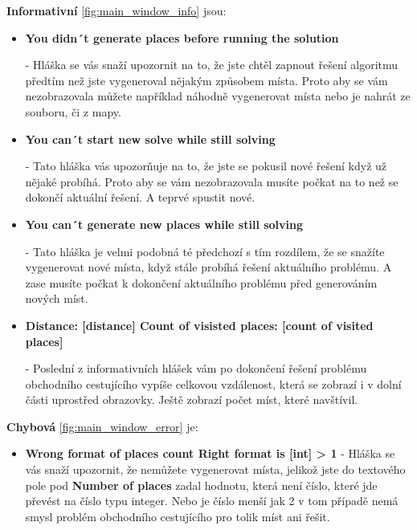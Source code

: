 \textbf{Informativní} \ref{fig:main_window_info} jsou:
\begin{itemize}
    \item \textbf{You didn´t generate places before running the solution}
    
        - Hláška se vás snaží upozornit na to, že jste chtěl zapnout řešení algoritmu předtím než jste vygeneroval nějakým způsobem místa. Proto aby se vám nezobrazovala můžete například náhodně vygenerovat místa nebo je nahrát ze souboru, či z mapy.  
    \item \textbf{You can´t start new solve while still solving}
    
        - Tato hláška vás upozorňuje na to, že jste se pokusil nové řešení když už nějaké probíhá. Proto aby se vám nezobrazovala musíte počkat na to než se dokončí aktuální řešení. A teprvé spustit nové. 
    \item \textbf{You can´t generate new places while still solving}
    
        - Tato hláška je velmi podobná té předchozí s tím rozdílem, že se snažíte vygenerovat nové místa, když stále probíhá řešení aktuálního problému. A zase musíte počkat k dokončení aktuálního problému před generováním nových míst. 
    \item \textbf{Distance: [distance] Count of visisted places: [count of visited places]}
    
        - Poslední z informativních hlášek vám po dokončení řešení problému obchodního cestujícího vypíše celkovou vzdálenost, která se zobrazí i v dolní části uprostřed obrazovky. Ještě zobrazí počet míst, které navštívil. 
\end{itemize}
\textbf{Chybová} \ref{fig:main_window_error} je:
\begin{itemize}
    \item \textbf{Wrong format of places count Right format is [int] > 1}
        - Hláška se vás snaží upozornit, že nemůžete vygenerovat místa, jelikož jste do textového pole pod \textbf{Number of places} zadal hodnotu, která není číslo, které jde převést na číslo typu integer. Nebo je číslo menší jak 2 v tom případě nemá smysl problém obchodního cestujícího pro tolik míst ani řešit. 
\end{itemize}




